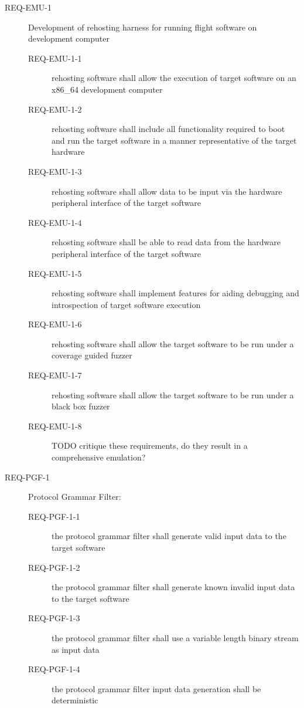 \documentclass[../report.tex]{subfiles}
\begin{document}
\begin{description}
\begin{description}
    \end{description}
    \item[REQ-EMU-1]Development of rehosting harness for running flight software on development computer
    \begin{description}
        \item[REQ-EMU-1-1]rehosting software shall allow the execution of target software on an x86\_64 development computer
        \item[REQ-EMU-1-2]rehosting software shall include all functionality required to boot and run the target software in a manner representative of the target hardware
        \item[REQ-EMU-1-3]rehosting software shall allow data to be input via the hardware peripheral interface of the target software
        \item[REQ-EMU-1-4]rehosting software shall be able to read data from the hardware peripheral interface of the target software
        \item[REQ-EMU-1-5]rehosting software shall implement features for aiding debugging and introspection of target software execution
        \item[REQ-EMU-1-6]rehosting software shall allow the target software to be run under a coverage guided fuzzer
        \item[REQ-EMU-1-7]rehosting software shall allow the target software to be run under a black box fuzzer
        \item[REQ-EMU-1-8]TODO critique these requirements, do they result in a comprehensive emulation?

    \end{description}
    \item[REQ-PGF-1]Protocol Grammar Filter:
    \begin{description}
        \item[REQ-PGF-1-1]the protocol grammar filter shall generate valid input data to the target software
        \item[REQ-PGF-1-2]the protocol grammar filter shall generate known invalid input data to the target software
        \item[REQ-PGF-1-3]the protocol grammar filter shall use a variable length binary stream as input data
        \item[REQ-PGF-1-4]the protocol grammar filter input data generation shall be deterministic

    \end{description}
\end{description}
\end{document}

